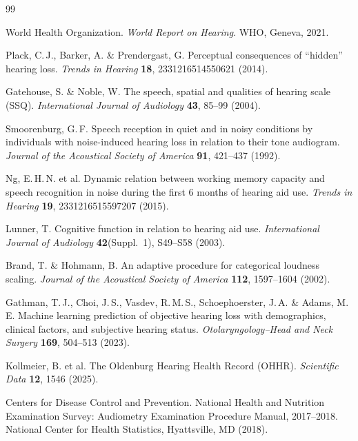 \documentclass[12pt,a4paper]{article}
\begin{document}
\begin{thebibliography}{99}

World Health Organization. \textit{World Report on Hearing}. WHO, Geneva,
2021.

Plack, C.\,J., Barker, A. \& Prendergast, G.
Perceptual consequences of ``hidden'' hearing loss.
\textit{Trends in Hearing} \textbf{18}, 2331216514550621 (2014).

Gatehouse, S. \& Noble, W.
The speech, spatial and qualities of hearing scale (SSQ).
\textit{International Journal of Audiology} \textbf{43}, 85--99 (2004).

Smoorenburg, G.\,F.
Speech reception in quiet and in noisy conditions by individuals with
noise-induced hearing loss in relation to their tone audiogram.
\textit{Journal of the Acoustical Society of America} \textbf{91},
421--437 (1992).

Ng, E.\,H.\,N. et al.
Dynamic relation between working memory capacity and speech recognition in
noise during the first 6 months of hearing aid use.
\textit{Trends in Hearing} \textbf{19}, 2331216515597207 (2015).

Lunner, T.
Cognitive function in relation to hearing aid use.
\textit{International Journal of Audiology} \textbf{42}(Suppl.~1),
S49--S58 (2003).

Brand, T. \& Hohmann, B.
An adaptive procedure for categorical loudness scaling.
\textit{Journal of the Acoustical Society of America} \textbf{112},
1597--1604 (2002).

Gathman, T.\,J., Choi, J.\,S., Vasdev, R.\,M.\,S., Schoephoerster, J.\,A. \&
Adams, M.\,E.
Machine learning prediction of objective hearing loss with demographics,
clinical factors, and subjective hearing status.
\textit{Otolaryngology--Head and Neck Surgery} \textbf{169}, 504--513 (2023).

Kollmeier, B. et al.
The Oldenburg Hearing Health Record (OHHR).
\textit{Scientific Data} \textbf{12}, 1546 (2025).

Centers for Disease Control and Prevention.
National Health and Nutrition Examination Survey: Audiometry Examination
Procedure Manual, 2017--2018.
National Center for Health Statistics, Hyattsville, MD (2018).


\end{thebibliography}
\end{document}
